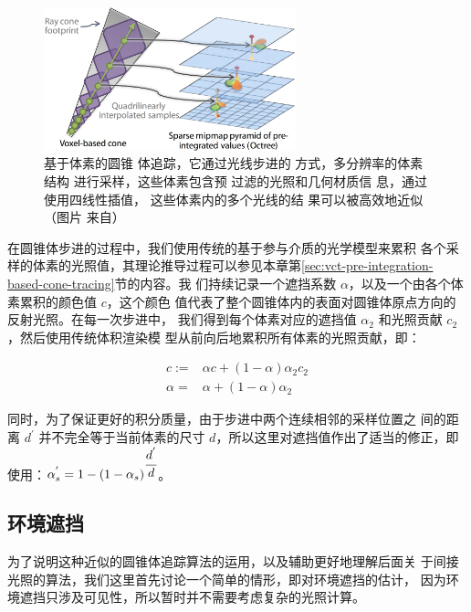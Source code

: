 \begin{figure}
	\sidecaption
	\includegraphics[width=0.65\textwidth]{figures/vct/vct-7-4}
	\caption{基于体素的圆锥 体追踪，它通过光线步进的 方式，多分辨率的体素结构 进行采样，这些体素包含预 过滤的光照和几何材质信 息，通过使用四线性插值， 这些体素内的多个光线的结 果可以被高效地近似（图片 来自\cite{a:Gigavoxels:Avoxelbasedrenderingpipelineforefficientexplorationoflargeanddetailedscenes}）}
	\label{f:vct-cone-tracing}
\end{figure}

在圆锥体步进的过程中，我们使用传统的基于参与介质的光学模型来累积 各个采样的体素的光照值，其理论推导过程可以参见本章第\ref{sec:vct-pre-integration-based-cone-tracing}节的内容。我 们持续记录一个遮挡系数 $\alpha$，以及一个由各个体素累积的颜色值 $c$，这个颜色 值代表了整个圆锥体内的表面对圆锥体原点方向的反射光照。在每一次步进中， 我们得到每个体素对应的遮挡值 $\alpha_2$ 和光照贡献 $c_2$，然后使用传统体积渲染模 型从前向后地累积所有体素的光照贡献，即：

\begin{equation}
\begin{aligned}
	c:=&\alpha c+(1-\alpha)\alpha_2c_2\\
	\alpha=&\alpha+(1-\alpha)\alpha_2
\end{aligned}
\end{equation}

同时，为了保证更好的积分质量，由于步进中两个连续相邻的采样位置之 间的距离 $d^{'}$ 并不完全等于当前体素的尺寸 $d$，所以这里对遮挡值作出了适当的修正，即使用：$\alpha^{'}_s=1-(1-\alpha_s)^{\cfrac{d^{'}}{d}}$。



\subsection{环境遮挡}
为了说明这种近似的圆锥体追踪算法的运用，以及辅助更好地理解后面关 于间接光照的算法，我们这里首先讨论一个简单的情形，即对环境遮挡的估计， 因为环境遮挡只涉及可见性，所以暂时并不需要考虑复杂的光照计算。

